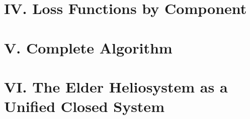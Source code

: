 \documentclass[11pt,twoside]{book}
\begin{document}
\section*{IV. Loss Functions by Component}

\section*{V. Complete Algorithm}

\section*{VI. The Elder Heliosystem as a Unified Closed System}
\end{document}
